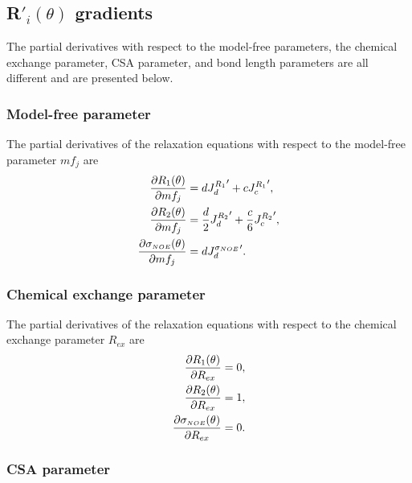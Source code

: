 
\subsection{R$'_i(\theta)$ gradients}

The partial derivatives with respect to the model-free parameters, the chemical exchange parameter, CSA parameter, and bond length parameters are all different and are presented below.


\subsubsection{Model-free parameter}

The partial derivatives of the relaxation equations with respect to the model-free parameter $mf_j$ are
\begin{align}
    \frac{\partial R_1(\theta)}{\partial mf_j} &= d {J_d^{R_1}}' + c {J_c^{R_1}}',                      \label{eq: Ri': dR1/dmf} \\
    \frac{\partial R_2(\theta)}{\partial mf_j} &= \frac{d}{2} {J_d^{R_2}}' + \frac{c}{6} {J_c^{R_2}}',  \label{eq: Ri': dR2/dmf} \\
    \frac{\partial \sigma_{\scriptscriptstyle NOE}(\theta)}{\partial mf_j} &= d {J_d^{\sigma_{\scriptscriptstyle NOE}}}'.                           \label{eq: Ri': dsigmaNOE/dmf}
\end{align}


\subsubsection{Chemical exchange parameter}

The partial derivatives of the relaxation equations with respect to the chemical exchange parameter $R_{ex}$ are
\begin{align}
    \frac{\partial R_1(\theta)}{\partial R_{ex}} &= 0,          \label{eq: Ri': dR1/dRex} \\
    \frac{\partial R_2(\theta)}{\partial R_{ex}} &= 1,          \label{eq: Ri': dR2/dRex} \\
    \frac{\partial \sigma_{\scriptscriptstyle NOE}(\theta)}{\partial R_{ex}} &= 0.    \label{eq: Ri': dsigmaNOE/dRex}
\end{align}


\subsubsection{CSA parameter}

